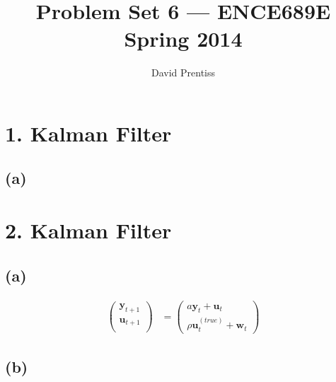 \documentclass[fleqn, letterpaper]{tufte-handout}
\title{Problem Set 6 --- ENCE689E Spring 2014}
\author{David Prentiss}
\begin{document}
\maketitle

\section{1. Kalman Filter}
\subsection{(a)}

\section{2. Kalman Filter}

{\scriptsize
        \begin{minipage}{\linewidth}
                
        \end{minipage}
}

\subsection{(a)}
\begin{align*}
\begin{pmatrix}
\mathbf{y}_{t+1} \\
\mathbf{u}_{t+1} \\
\end{pmatrix}
&=
\begin{pmatrix}
a\mathbf{y}_t + \mathbf{u}_t \\
\rho\mathbf{u}^{(true)}_t+ \mathbf{w}_t
\end{pmatrix}
\end{align*}

\subsection{(b)}
\end{document}
